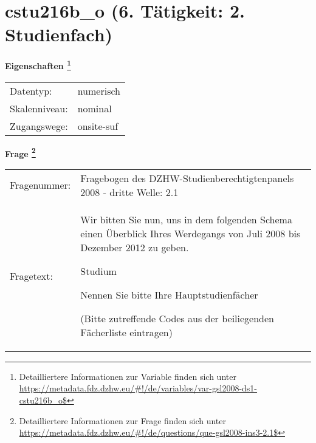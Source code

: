 
    \setcounter{footnote}{0}

    \vspace*{-1.8cm}
	\section{cstu216b\_o (6. Tätigkeit: 2. Studienfach)}
	\label{section:cstu216b_o}



    \vspace*{0.5cm}
    \noindent\textbf{Eigenschaften
	\footnote{Detailliertere Informationen zur Variable finden sich unter
		\url{https://metadata.fdz.dzhw.eu/\#!/de/variables/var-gsl2008-ds1-cstu216b_o$}}}\\
	\begin{tabularx}{\hsize}{@{}lX}
	Datentyp: & numerisch \\
	Skalenniveau: & nominal \\
	Zugangswege: &
	  onsite-suf
 \\
    \end{tabularx}



				\vspace*{0.5cm}
                \noindent\textbf{Frage
	                \footnote{Detailliertere Informationen zur Frage finden sich unter
		              \url{https://metadata.fdz.dzhw.eu/\#!/de/questions/que-gsl2008-ins3-2.1$}}}\\
				\begin{tabularx}{\hsize}{@{}lX}
					Fragenummer: &
					  Fragebogen des DZHW-Studienberechtigtenpanels 2008 - dritte Welle:
					  2.1
 \\
					Fragetext: & Wir bitten Sie nun, uns in dem folgenden Schema einen Überblick Ihres Werdegangs von Juli 2008 bis Dezember 2012 zu geben.\par  Studium\par  Nennen Sie bitte Ihre Hauptstudienfächer\par  (Bitte zutreffende Codes aus der beiliegenden Fächerliste eintragen) \\
				\end{tabularx}





